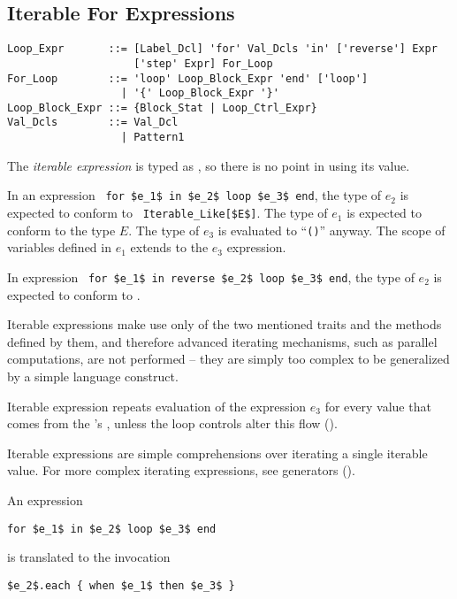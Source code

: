 \subsection{Iterable For Expressions}
\label{sec:iterable-expressions}

\syntax\begin{lstlisting}
Loop_Expr       ::= [Label_Dcl] 'for' Val_Dcls 'in' ['reverse'] Expr 
                    ['step' Expr] For_Loop
For_Loop        ::= 'loop' Loop_Block_Expr 'end' ['loop']
                  | '{' Loop_Block_Expr '}'
Loop_Block_Expr ::= {Block_Stat | Loop_Ctrl_Expr}
Val_Dcls        ::= Val_Dcl
                  | Pattern1
\end{lstlisting}

The {\em iterable expression} is typed as , so there is no point in using its value. 

In an expression ~\lstinline!for $e_1$ in $e_2$ loop $e_3$ end!, the type of $e_2$ is expected to conform to ~\lstinline!Iterable_Like[$E$]!. The type of $e_1$ is expected to conform to the type $E$. The type of $e_3$ is evaluated to ``\lstinline!()!'' anyway. The scope of variables defined in $e_1$ extends to the $e_3$ expression. 

In expression ~\lstinline!for $e_1$ in reverse $e_2$ loop $e_3$ end!, the type of $e_2$ is expected to conform to . 

Iterable expressions make use only of the two mentioned traits and the methods defined by them, and therefore advanced iterating mechanisms, such as parallel computations, are not performed -- they are simply too complex to be generalized by a simple language construct. 

Iterable expression repeats evaluation of the expression $e_3$ for every value that comes from the 's , unless the loop controls alter this flow ().

Iterable expressions are simple comprehensions over iterating a single iterable value. For more complex iterating expressions, see generators ().

An expression 
\begin{lstlisting}
for $e_1$ in $e_2$ loop $e_3$ end
\end{lstlisting} 
is translated to the invocation
\begin{lstlisting}
$e_2$.each { when $e_1$ then $e_3$ }
\end{lstlisting} 

